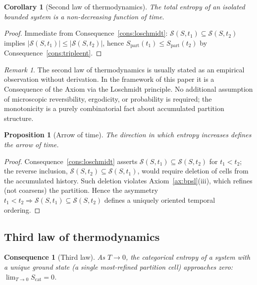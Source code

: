 \documentclass[11pt,twocolumn,a4paper]{article}
\theoremstyle{axiomstyle}
\theoremstyle{conseqstyle}
\newtheorem{consequence}{Consequence}
\newtheorem{proposition}{Proposition}
\newtheorem{corollary}{Corollary}
\theoremstyle{definition}
\theoremstyle{remark}
\newtheorem*{remark}{Remark}
\newcommand{\Se}{S_{\mathrm{part}}}
\newcommand{\Sspace}{\mathcal{S}}
\begin{document}
\begin{corollary}[Second law of thermodynamics]
\label{cor:secondlaw}
The total entropy of an isolated bounded system is a non-decreasing function of time.
\end{corollary}

\begin{proof}
Immediate from Consequence~\ref{cons:loschmidt}: $\Sspace(S,t_{1})\subseteq\Sspace(S,t_{2})$ implies $|\Sspace(S,t_{1})|\le|\Sspace(S,t_{2})|$, hence $\Se(t_{1})\le\Se(t_{2})$ by Consequence~\ref{cons:tripleent}.
\end{proof}

\begin{remark}
The second law of thermodynamics is usually stated as an empirical observation without derivation. In the framework of this paper it is a Consequence of the Axiom via the Loschmidt principle. No additional assumption of microscopic reversibility, ergodicity, or probability is required; the monotonicity is a purely combinatorial fact about accumulated partition structure.
\end{remark}

\begin{proposition}[Arrow of time]
\label{prop:arrowtime}
The direction in which entropy increases defines the arrow of time.
\end{proposition}

\begin{proof}
Consequence~\ref{cons:loschmidt} asserts $\Sspace(S,t_{1})\subseteq\Sspace(S,t_{2})$ for $t_{1}<t_{2}$; the reverse inclusion, $\Sspace(S,t_{2})\subseteq\Sspace(S,t_{1})$, would require deletion of cells from the accumulated history. Such deletion violates Axiom~\ref{ax:bpsl}(iii), which refines (not coarsens) the partition. Hence the asymmetry $t_{1}<t_{2}\Rightarrow\Sspace(S,t_{1})\subseteq\Sspace(S,t_{2})$ defines a uniquely oriented temporal ordering.
\end{proof}

\subsection{Third law of thermodynamics}

\begin{consequence}[Third law]
\label{cons:thirdlaw}
As $T\to 0$, the categorical entropy of a system with a unique ground state (a single most-refined partition cell) approaches zero: $\lim_{T\to 0}S_{\text{cat}}=0$.
\end{consequence}
\end{document}
